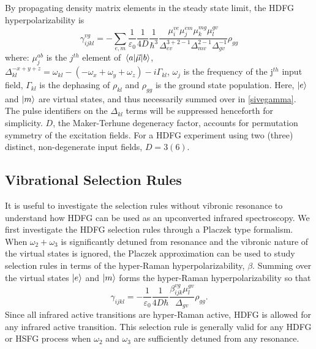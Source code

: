 \documentclass[aip, jcp, reprint, onecolumn, nofootinbib]{revtex4-2}
\begin{document}
By propagating density matrix elements in the steady state limit, the HDFG hyperpolarizability is \cite{RN133}
\begin{equation}\label{sivegamma}
		\gamma_{ijkl}^{vg} =	- \sum_{e,m} \frac{1}{\varepsilon_0} \frac{1}{4D} \frac{1}{\hbar^3} \frac{\mu^{ve}_{i} \mu^{em}_{j} \mu^{mg}_{k} \mu^{gv}_{l} }{\Delta_{ev}^{3+2-1} \Delta_{mv}^{2-1}\Delta_{gv}^{-1}}  \rho_{gg}
\end{equation}
where: $\mu^{ab}_{j}$ is the $j^{th}$ element of $\mel{a}{\vec{\mu}}{b}$, $\Delta_{kl}^{-x+y+z} = \omega_{kl} - (-\omega_{x}+\omega_{y} + \omega_{z}) - i\Gamma_{kl}$, $\omega_j$ is the frequency of the j$^{th}$ input field, $\Gamma_{kl}$ is the dephasing of $\rho_{kl}$ and $\rho_{gg}$ is the ground state population.
Here, $\ket{e}$ and $\ket{m}$ are virtual states, and thus necessarily summed over in \autoref{sivegamma}.
The pulse identifiers on the $\Delta_{kl}$ terms will be suppressed henceforth for simplicity.
$D$, the Maker-Terhune degeneracy factor, accounts for permutation symmetry of the excitation fields.\cite{RN134} 
For a HDFG experiment using two (three) distinct, non-degenerate input fields, $D = 3 (6)$.

\subsection{Vibrational Selection Rules}

It is useful to investigate the selection rules without vibronic resonance to understand how HDFG can be used as an upconverted infrared spectroscopy.
We first investigate the HDFG selection rules through a Placzek type formalism.
When $\omega_2+\omega_3$ is significantly detuned from resonance and the vibronic nature of the virtual states is ignored, the Placzek approximation can be used to study selection rules in terms of the hyper-Raman hyperpolarizability, $\beta$. \cite{Placzek1934, Long1970, Altmann1982}
Summing over the virtual states $\ket{e}$ and $\ket{m}$ forms the hyper-Raman hyperpolarizability so that\cite{Long1970} 
\begin{equation}\label{sivebeta}
	\gamma_{ijkl} =	-\frac{1}{\varepsilon_0} \frac{1}{4D \hbar}\frac{\beta^{vg}_{ijk} \mu^{gv}_{l}}{\Delta_{gv}} \rho_{gg}.
\end{equation}
Since all infrared active transitions are hyper-Raman active, HDFG is allowed for any infrared active transition. \cite{Andrews1978}
This selection rule is generally valid for any HDFG or HSFG process when $\omega_2$ and $\omega_3$ are sufficiently detuned from any resonance.
\end{document}

